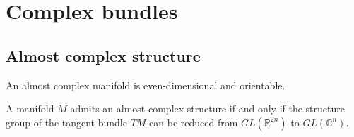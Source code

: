 \section{Complex bundles}

\subsection{Almost complex structure}

	
	\begin{property}
		An almost complex manifold is even-dimensional and orientable.
	\end{property}
	
	\begin{property}
		A manifold $M$ admits an almost complex structure if and only if the structure group of the tangent bundle $TM$ can be reduced from $GL(\mathbb{R}^{2n})$ to $GL(\mathbb{C}^n)$.
	\end{property}
